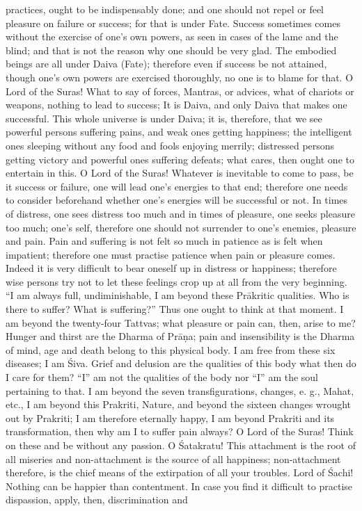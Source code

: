 practices, ought to be indispensably done; and one should not repel or feel pleasure on failure or success; for that is under Fate. Success sometimes comes without the exercise of one's own powers, as seen in cases of the lame and the blind; and that is not the reason why one should be very glad. The embodied beings are all under Daiva (Fate); therefore even if success be not attained, though one's own powers are exercised thoroughly, no one is to blame for that. O Lord of the Suras! What to say of forces, Mantras, or advices, what of chariots or weapons, nothing to lead to success; It is Daiva, and only Daiva that makes one successful. This whole universe is under Daiva; it is, therefore, that we see powerful persons suffering pains, and weak ones getting happiness; the intelligent ones sleeping without any food and fools enjoying merrily; distressed persons getting victory and powerful ones suffering defeats; what cares, then ought one to entertain in this. O Lord of the Suras! Whatever is inevitable to come to pass, be it success or failure, one will lead one's energies to that end; therefore one needs to consider beforehand whether one's energies will be successful or not. In times of distress, one sees distress too much and in times of pleasure, one seeks pleasure too much; one's self, therefore one should not surrender to one's enemies, pleasure and pain. Pain and suffering is not felt so much in patience as is felt when impatient; therefore one must practise patience when pain or pleasure comes. Indeed it is very difficult to bear oneself up in distress or happiness; therefore wise persons try not to let these feelings crop up at all from the very beginning. ``I am always full, undiminishable, I am beyond these Pr\=akritic qualities. Who is there to suffer? What is suffering?'' Thus one ought to think at that moment. I am beyond the twenty-four Tattvas; what pleasure or pain can, then, arise to me? Hunger and thirst are the Dharma of Pr\=a\d{n}a; pain and insensibility is the Dharma of mind, age and death belong to this physical body. I am free from these six diseases; I am \'Siva. Grief and delusion are the qualities of this body what then do I care for them? ``I'' am not the qualities of the body nor ``I'' am the soul pertaining to that. I am beyond the seven transfigurations, changes, e. g., Mahat, etc., I am beyond this Prakriti, Nature, and beyond the sixteen changes wrought out by Prakriti; I am therefore eternally happy, I am beyond Prakriti and its transformation, then why am I to suffer pain always? O Lord of the Suras! Think on these and be without any passion. O \'Satakratu! This attachment is the root of all miseries and non-attachment is the source of all happiness; non-attachment therefore, is the chief means of the extirpation of all your troubles. Lord of \'Sachi! Nothing can be happier than contentment. In case you find it difficult to practise dispassion, apply, then, discrimination and

